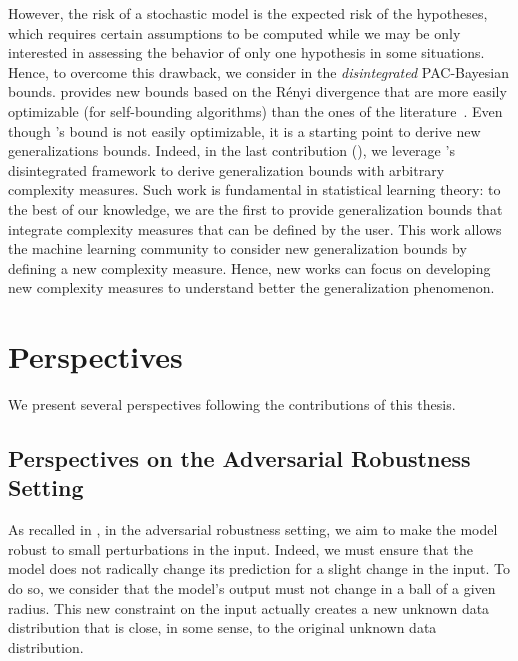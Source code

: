 However, the risk of a stochastic model is the expected risk of the hypotheses, which requires certain assumptions to be computed while we may be only interested in assessing the behavior of only one hypothesis in some situations.
Hence, to overcome this drawback, we consider in  the {\it disintegrated} PAC-Bayesian bounds.
 provides new bounds based on the Rényi divergence that are more easily optimizable (for self-bounding algorithms) than the ones of the literature~\citep[\ie, ][]{BlanchardFleuret2007,Catoni2007,RivasplataKuzborskijSzepesvariShaweTaylor2020}.
Even though \citet{RivasplataKuzborskijSzepesvariShaweTaylor2020}'s bound is not easily optimizable, it is a starting point to derive new generalizations bounds.
Indeed, in the last contribution (), we leverage \citet{RivasplataKuzborskijSzepesvariShaweTaylor2020}'s disintegrated framework to derive generalization bounds with arbitrary complexity measures.
Such work is fundamental in statistical learning theory: to the best of our knowledge, we are the first to provide generalization bounds that integrate complexity measures that can be defined by the user.
This work allows the machine learning community to consider new generalization bounds by defining a new complexity measure.
Hence, new works can focus on developing new complexity measures to understand better the generalization phenomenon.

\section*{Perspectives}

We present several perspectives following the contributions of this thesis.

\subsection*{Perspectives on the Adversarial Robustness Setting}

As recalled in , in the adversarial robustness setting, we aim to make the model robust to small perturbations in the input.
Indeed, we must ensure that the model does not radically change its prediction for a slight change in the input.
To do so, we consider that the model's output must not change in a ball of a given radius.
This new constraint on the input actually creates a new unknown data distribution that is close, in some sense, to the original unknown data distribution.\\

